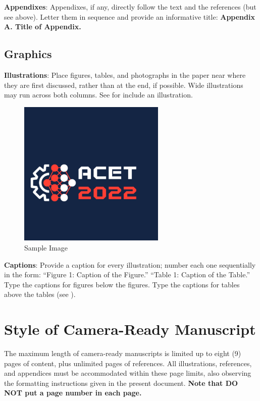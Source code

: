 \documentclass[11pt,a4paper]{article}
\begin{document}
{\bf Appendixes}: Appendixes, if any, directly follow the text and the
references (but see above).  Letter them in sequence and provide an
informative title: {\bf Appendix A. Title of Appendix.}

\subsection{Graphics}

{\bf Illustrations}: Place figures, tables, and photographs in the paper
near where they are first discussed, rather than at the end, if
possible.  Wide illustrations may run across both columns.  See
 for include an illustration.

\begin{figure}[ht]
\begin{center}
\includegraphics[width=7cm]{./fig/ACET_logo.pdf}
\caption{Sample Image} \label{sampleimg}
\end{center}
\end{figure} 

{\bf Captions}: Provide a caption for every illustration; number each
one sequentially in the form: ``Figure 1:  Caption of the Figure.''
``Table 1:  Caption of the Table.''  Type the captions for figures below
the figures.  Type the captions for tables above the tables (see
).


\section{Style of Camera-Ready Manuscript}

The maximum length of camera-ready manuscripts is limited up to eight (9) pages of content, plus unlimited pages of references. All illustrations, references, and appendices must be accommodated within these page limits, also observing the formatting instructions given in the present document.  {\bf Note that DO NOT put a page number in each page.}
\end{document}
